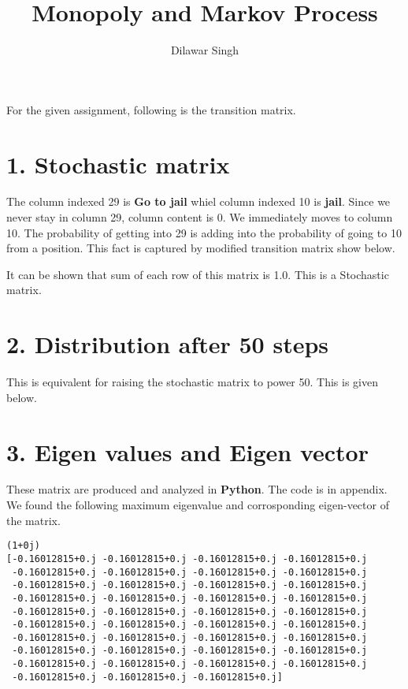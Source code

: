 \documentclass[]{article}
\title{Monopoly and Markov Process}
\author{Dilawar Singh}
\date{}
\begin{document}
\maketitle

For the given assignment, following is the transition matrix.

\begin{tiny}
    
\end{tiny}

\section{1. Stochastic matrix}\label{stochastic-matrix}

The column indexed 29 is \textbf{Go to jail} whiel column indexed 10 is
\textbf{jail}. Since we never stay in column 29, column content is 0. We
immediately moves to column 10. The probability of getting into 29 is
adding into the probability of going to 10 from a position. This fact is
captured by modified transition matrix show below.

\begin{tiny}
    
\end{tiny}

It can be shown that sum of each row of this matrix is 1.0. This is a
Stochastic matrix.

\section{2. Distribution after 50
steps}\label{distribution-after-50-steps}

This is equivalent for raising the stochastic matrix to power 50. This
is given below.

\begin{tiny}
    
\end{tiny}

\section{3. Eigen values and Eigen
vector}\label{eigen-values-and-eigen-vector}

These matrix are produced and analyzed in \textbf{Python}. The code is
in appendix. We found the following maximum eigenvalue and corrosponding
eigen-vector of the matrix.

\begin{verbatim}
(1+0j)
[-0.16012815+0.j -0.16012815+0.j -0.16012815+0.j -0.16012815+0.j
 -0.16012815+0.j -0.16012815+0.j -0.16012815+0.j -0.16012815+0.j
 -0.16012815+0.j -0.16012815+0.j -0.16012815+0.j -0.16012815+0.j
 -0.16012815+0.j -0.16012815+0.j -0.16012815+0.j -0.16012815+0.j
 -0.16012815+0.j -0.16012815+0.j -0.16012815+0.j -0.16012815+0.j
 -0.16012815+0.j -0.16012815+0.j -0.16012815+0.j -0.16012815+0.j
 -0.16012815+0.j -0.16012815+0.j -0.16012815+0.j -0.16012815+0.j
 -0.16012815+0.j -0.16012815+0.j -0.16012815+0.j -0.16012815+0.j
 -0.16012815+0.j -0.16012815+0.j -0.16012815+0.j -0.16012815+0.j
 -0.16012815+0.j -0.16012815+0.j -0.16012815+0.j]
\end{verbatim}
\end{document}
